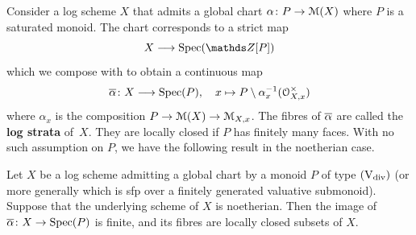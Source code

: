 Consider a log scheme $X$ that admits a global chart $\alpha\colon P\to {\mathcal M}(X)$ where $P$ is a saturated monoid. The chart corresponds to a strict map
\[ 
    X \la \Spec(\bZ[P])
\]
which we compose with  to obtain a continuous map
\[ 
    \overline{\alpha}\colon X \longrightarrow \operatorname{Spec}(P), \quad x \mapsto P \setminus \alpha^{-1}_x({\mathcal O}_{X,x}^\times)
\]
where $\alpha_x$ is the composition $P\to {\mathcal M}(X) \to {\mathcal M}_{X,x}$. The fibres of $\overline{\alpha}$ are called the {\bf log strata} of~$X$. They are locally closed if $P$ has finitely many faces. With no such assumption on $P$, we have the following result in the noetherian case.

\begin{lem} \label{lem:noeth-faces}
    Let $X$ be a log scheme admitting a global chart by a monoid $P$ of type $(\mathrm{V}_{\rm div})$ (or more generally which is sfp over a finitely generated valuative submonoid). Suppose that the underlying scheme of $X$ is noetherian. Then the image of $\overline{\alpha}\colon X\to \operatorname{Spec}(P)$ is finite, and its fibres are locally closed subsets of $X$. 
\end{lem}

